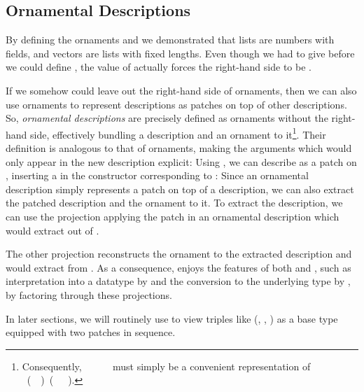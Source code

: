 \subsection{Ornamental Descriptions}\label{sec:background-ornamental-descriptions}
By defining the ornaments  and  we demonstrated that lists are numbers with fields, and vectors are lists with fixed lengths. Even though we had to give  before we could define , the value of  actually forces the right-hand side to be .

If we somehow could leave out the right-hand side of ornaments, then we can also use ornaments to represent descriptions as patches on top of other descriptions. So, \emph{ornamental descriptions} are precisely defined as ornaments without the right-hand side, effectively bundling a description and an ornament to it\footnote{Consequently, \ \ \ \ \  must simply be a convenient representation of \ (\ \ )\ (\ \ \ ).}. Their definition is analogous to that of ornaments, making the arguments which would only appear in the new description explicit:
Using , we can describe  as a patch on , inserting a  in the constructor corresponding to :
Since an ornamental description simply represents a patch on top of a description, we can also extract the patched description and the ornament to it. To extract the description, we can use the projection applying the patch in an ornamental description
which would extract  out of .

The other projection reconstructs the ornament to the extracted description
and would extract  from . As a consequence,  enjoys the features of both  and , such as interpretation into a datatype by  and the conversion to the underlying type by , by factoring through these projections.

In later sections, we will routinely use  to view triples like (, , ) as a base type equipped with two patches in sequence.

